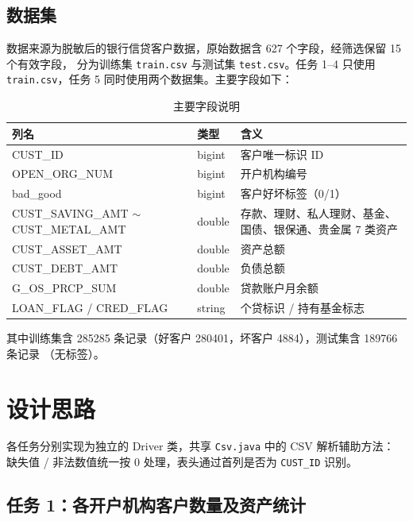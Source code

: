 \documentclass[UTF8,a4paper,12pt]{ctexart}
\begin{document}
\subsection{数据集}

数据来源为脱敏后的银行信贷客户数据，原始数据含 627 个字段，经筛选保留 15 个有效字段，
分为训练集 \texttt{train.csv} 与测试集 \texttt{test.csv}。任务 1--4 只使用
\texttt{train.csv}，任务 5 同时使用两个数据集。主要字段如下：

\begin{table}[H]
  \centering
  \caption{主要字段说明}
  \label{tab:fields}
  \begin{tabular}{lll}
    \toprule
    列名 & 类型 & 含义 \\
    \midrule
    CUST\_ID & bigint & 客户唯一标识 ID \\
    OPEN\_ORG\_NUM & bigint & 开户机构编号 \\
    bad\_good & bigint & 客户好坏标签（0/1） \\
    CUST\_SAVING\_AMT $\sim$ CUST\_METAL\_AMT & double & 存款、理财、私人理财、基金、国债、银保通、贵金属 7 类资产 \\
    CUST\_ASSET\_AMT & double & 资产总额 \\
    CUST\_DEBT\_AMT & double & 负债总额 \\
    G\_OS\_PRCP\_SUM & double & 贷款账户月余额 \\
    LOAN\_FLAG / CRED\_FLAG & string & 个贷标识 / 持有基金标志 \\
    \bottomrule
  \end{tabular}
\end{table}

其中训练集含 285285 条记录（好客户 280401，坏客户 4884），测试集含 189766 条记录
（无标签）。

\section{设计思路}

各任务分别实现为独立的 Driver 类，共享 \texttt{Csv.java} 中的 CSV 解析辅助方法：
缺失值 / 非法数值统一按 0 处理，表头通过首列是否为 \texttt{CUST\_ID} 识别。

\subsection{任务 1：各开户机构客户数量及资产统计}
\end{document}
